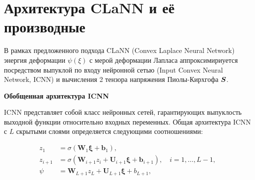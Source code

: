 


\section{Архитектура CLaNN и её производные}


В рамках предложенного подхода CLaNN (Convex Laplace Neural Network) энергия деформации \(\psi(\xi)\)
с мерой деформации Лапласа аппроксимириуется посредством выпуклой по входу нейронной сетью (Input Convex Neural Network, ICNN) \cite{icnn2018}
и вычисления 2 тензора напряжения Пиолы-Кирхгофа \(\boldsymbol{S}\). 

\textbf{Обобщенная архитектура ICNN}

ICNN представляет собой класс нейронных сетей, гарантирующих выпуклость выходной функции относительно входных переменных. 
Общая архитектура ICNN с $L$ скрытыми слоями определяется следующими соотношениями:

\begin{align}
z_1 &= \sigma(\mathbf{W}_1 \boldsymbol{\xi} + \mathbf{b}_1), \\
z_{i+1} &= \sigma(\mathbf{W}_{i+1} z_i + \mathbf{U}_{i+1} \boldsymbol{\xi} + \mathbf{b}_{i+1}), \quad i = 1, \ldots, L-1, \\
\psi &= \mathbf{W}_{L+1} z_L + \mathbf{U}_{L+1} \boldsymbol{\xi} + b_{L+1},
\end{align}

